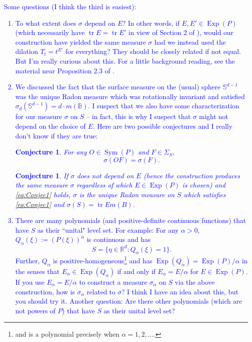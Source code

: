 \documentclass[11pt]{article}
\theoremstyle{theorem}
\newtheorem{conjecture}[theorem]{Conjecture}
\newcommand\Sym{\operatorname{Sym}}
\newcommand\Exp{\operatorname{Exp}}
\newcommand\tr{\operatorname{tr}}
\begin{document}
\textcolor{blue}{Some questions (I think the third is easiest):
\begin{enumerate}
\item To what extent does $\sigma$ depend on $E$? In other words, if $E,E'\in\Exp(P)$ (which necessarily have $\tr E=\tr E'$ in view of Section 2 of \cite{Randles2017}), would our construction have yielded the same measure $\sigma$ had we instead used the dilation $T_t=t^{E'}$ for everything? They should be closely related if not equal. But I'm really curious about this. For a little background reading, see the material near Proposition 2.3 of \cite{Randles2017}. 
\item We discussed the fact that the surface measure on the (usual) sphere $\mathbb{S}^{d-1}$ was the unique Radon measure which was rotationally invariant and satisfied $\sigma_d(\mathbb{S}^{d-1})=d\cdot m(\mathbb{B})$. I suspect that we also have some characterization for our measure $\sigma$ on $S$ -- in fact, this is why I suspect that $\sigma$ might not depend on the choice of $E$. Here are two possible conjectures and I really don't know if they are true:
\begin{conjecture} For any $O\in\Sym(P)$ and $F\in\Sigma_S$,
\begin{equation}\label{eq:Conjec1}
\sigma(O F)=\sigma(F).
\end{equation} 
\end{conjecture}
\begin{conjecture}
If $\sigma$ does not depend on $E$ (hence the construction produces the same measure $\sigma$ regardless of which $E\in\Exp(P)$ is chosen) and \eqref{eq:Conjec1} holds, $\sigma$ is the unique Radon measure on $S$ which satisfies \eqref{eq:Conjec1} and $\sigma(S)=\tr E m(B)$.
\end{conjecture}
\item There are many polynomials (and positive-definite continuous functions) that have $S$ as their ``unital" level set. For example: For any $\alpha>0$, $Q_{\alpha}(\xi):=(P(\xi))^\alpha$ is continuous and has
\begin{equation*}
S=\{\eta\in\mathbb{R}^d:Q_{\alpha}(\xi)=1\}.
\end{equation*}
Further, $Q_\alpha$ is positive-homogeneous\footnote{and is a polynomial precisely when $\alpha=1,2,\dots$.} and has $\Exp(Q_{\alpha})=\Exp(P)/\alpha$ in the senses that $E_\alpha\in \Exp(Q_\alpha)$ if and only if $E_\alpha=E/\alpha$ for $E\in \Exp(P)$. If you use $E_{\alpha}=E/\alpha$ to construct a measure $\sigma_\alpha$ on $S$ via the above construction, how is $\sigma_\alpha$ related to $\sigma$? I think I have an idea about this, but you should try it. Another question: Are there other polynomials (which are not powers of $P$) that have $S$ as their unital level set? 
\end{enumerate}}
\end{document}
